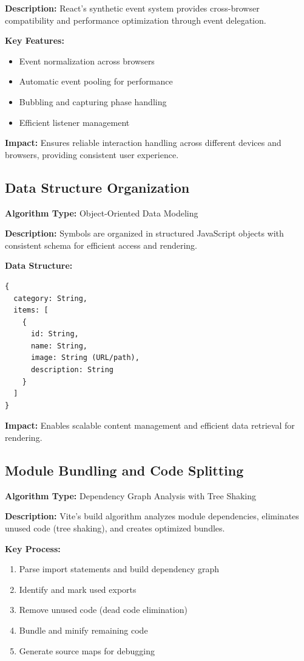 \documentclass[12pt,a4paper]{article}
\begin{document}
\textbf{Description:}
React's synthetic event system provides cross-browser compatibility and performance optimization through event delegation.

\textbf{Key Features:}
\begin{itemize}
    \item Event normalization across browsers
    \item Automatic event pooling for performance
    \item Bubbling and capturing phase handling
    \item Efficient listener management
\end{itemize}

\textbf{Impact:}
Ensures reliable interaction handling across different devices and browsers, providing consistent user experience.

\subsection{Data Structure Organization}
\textbf{Algorithm Type:} Object-Oriented Data Modeling

\textbf{Description:}
Symbols are organized in structured JavaScript objects with consistent schema for efficient access and rendering.

\textbf{Data Structure:}
\begin{verbatim}
{
  category: String,
  items: [
    {
      id: String,
      name: String,
      image: String (URL/path),
      description: String
    }
  ]
}
\end{verbatim}

\textbf{Impact:}
Enables scalable content management and efficient data retrieval for rendering.

\subsection{Module Bundling and Code Splitting}
\textbf{Algorithm Type:} Dependency Graph Analysis with Tree Shaking

\textbf{Description:}
Vite's build algorithm analyzes module dependencies, eliminates unused code (tree shaking), and creates optimized bundles.

\textbf{Key Process:}
\begin{enumerate}
    \item Parse import statements and build dependency graph
    \item Identify and mark used exports
    \item Remove unused code (dead code elimination)
    \item Bundle and minify remaining code
    \item Generate source maps for debugging
\end{enumerate}
\end{document}
